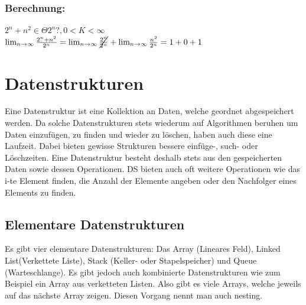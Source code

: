 \documentclass{article}
\begin{document}
	\subsubsection{Berechnung:}
	$2^n+n^2\in\Theta{2^n}?, 0<K<\infty$ \\ 
	$\lim_{n\to\infty}\frac{2^n+n^2}{2^n}=\lim_{n\to\infty}\cancel{\frac{2^n}{2^n}}+\lim_{n\to\infty}\frac{n^2}{2^n}=1+0+1$
	\section{Datenstrukturen}
	Eine Datenstruktur ist eine Kollektion an Daten, welche geordnet abgespeichert werden. Da solche Datenstrukturen stets wiederum auf Algorithmen beruhen um Daten einzufügen, zu finden und wieder zu löschen, haben auch diese eine Laufzeit. Dabei bieten gewisse Strukturen bessere einfüge-, such- oder Löschzeiten. Eine Datenstruktur besteht deshalb stets aus den gespeicherten Daten sowie dessen Operationen. DS bieten auch oft weitere Operationen wie das i-te Element finden, die Anzahl der Elemente angeben oder den Nachfolger eines Elements zu finden. \\
	\subsection{Elementare Datenstrukturen}
	Es gibt vier elementare Datenstrukturen: Das Array (Lineares Feld), Linked List(Verkettete Liste), Stack (Keller- oder Stapelspeicher) und Queue (Warteschlange). Es gibt jedoch auch kombinierte Datenstrukturen wie zum Beispiel ein Array aus verketteten Listen. Also gibt es viele Arrays, welche jeweils auf das nächste Array zeigen. Diesen Vorgang nennt man auch nesting.
\end{document}
